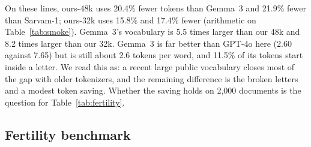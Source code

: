 \documentclass[11pt]{article}
\begin{document}
On these lines, ours-48k uses 20.4\% fewer tokens than Gemma~3 and 21.9\% fewer than Sarvam-1; ours-32k uses 15.8\% and 17.4\% fewer (arithmetic on Table~\ref{tab:smoke}).
Gemma~3's vocabulary is 5.5 times larger than our 48k and 8.2 times larger than our 32k.
Gemma~3 is far better than GPT-4o here (2.60 against 7.65) but is still about 2.6 tokens per word, and 11.5\% of its tokens start inside a letter.
We read this as: a recent large public vocabulary closes most of the gap with older tokenizers, and the remaining difference is the broken letters and a modest token saving.
Whether the saving holds on 2,000 documents is the question for Table~\ref{tab:fertility}.

\subsection{Fertility benchmark}
\end{document}
